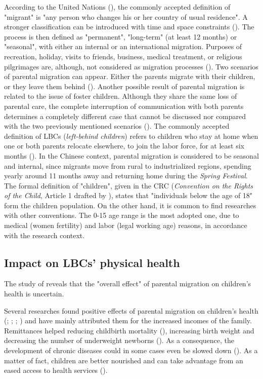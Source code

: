 According to the United Nations (\cite{united1998recommendations}), the commonly accepted definition of "migrant" is "any person who changes his or her country of usual residence". A stronger classification can be introduced with time and space constraints (\cite{rossi2008impact}). The process is then defined as "permanent", "long-term" (at least 12 months) or "seasonal", with either an internal or an international migration. Purposes of recreation, holiday, visits to friends, business, medical treatment, or religious pilgrimages are, although, not considered as migration processes (\cite{united1998recommendations}). Two scenarios of parental migration can appear. Either the parents migrate with their children, or they leave them behind (\cite{rossi2008impact}). Another possible result of parental migration is related to the issue of foster children. Although they share the same loss of parental care, the complete interruption of communication with both parents determines a completely different case that cannot be discussed nor compared with the two previously mentioned scenarios (\cite{pilon2003foster}). The commonly accepted definition of LBCs (\textit{left-behind children}) refers to children who stay at home when one or both parents relocate elsewhere, to join the labor force, for at least six months (\cite{lu2011left}). In the Chinese context, parental migration is considered to be seasonal and internal, since migrants move from rural to industrialized regions, spending yearly around 11 months away and returning home during the \textit{Spring Festival}. The formal definition of "children", given in the CRC (\textit{Convention on the Rights of the Child}, Article 1 drafted by \textcite{unicef1989convention}), states that "individuals below the age of 18" form the children population. On the other hand, it is common to find researches with other conventions. The 0-15 age range is the most adopted one, due to medical (women fertility) and labor (legal working age) reasons, in accordance with the research context.

\subsection{Impact on LBCs' physical health}

The study of \textcite{guo2017effect} reveals that the "overall effect" of parental migration on children's health is uncertain. 

Several researches found positive effects of parental migration on children's health (\cite{mundial2006development}; \cite{acosta2007impact}; \cite{anton2010impact}; \cite{stillman2012impact}) and have mainly attributed them for the increased incomes of the family. Remittances helped reducing childbirth mortality (\cite{hildebrandt2005effects}), increasing birth weight and decreasing the number of underweight newborns (\cite{frank2002other}). As a consequence, the development of chronic diseases could in some cases even be slowed down (\cite{case2002economic}). As a matter of fact, children are better nourished and can take advantage from an eased access to health services (\cite{nobles2006contribution}). 

